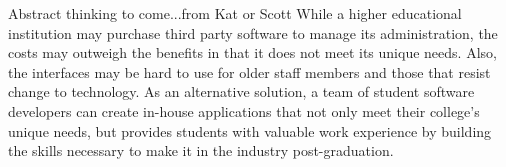 Abstract thinking to come...from Kat or Scott
While a higher educational institution may purchase third party software to manage its administration, the costs may outweigh the benefits in that it does not meet its unique needs. Also, the interfaces may be hard to use for older staff members and those that resist change to technology. As an alternative solution, a team of student software developers can create in-house applications that not only meet their college's unique needs, but provides students with valuable work experience by building the skills necessary to make it in the industry post-graduation.